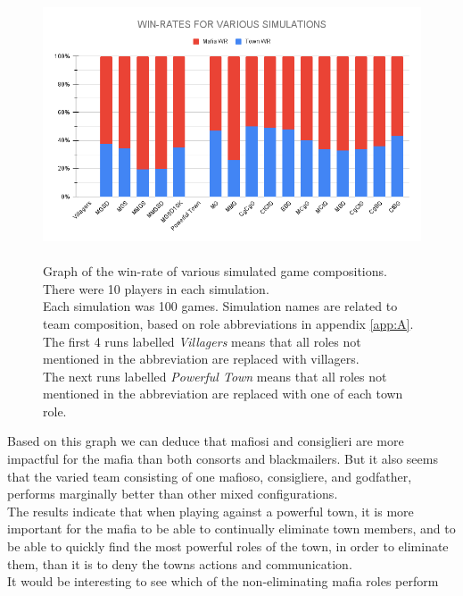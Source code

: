 \begin{figure}[H]
    \includegraphics[width=1\linewidth]{figures/Winrates}
    \caption{\\Graph of the win-rate of various simulated game compositions.\\
        There were 10 players in each simulation.\\
        Each simulation was 100 games.
        Simulation names are related to team composition, based on role
        abbreviations in appendix \ref{app:A}.\\
        The first 4 runs labelled \textit{Villagers} means that all roles not
        mentioned in the abbreviation are replaced with villagers.\\
        The next runs labelled \textit{Powerful Town} means that all roles not
        mentioned in the abbreviation are replaced with	one of each town role.}
    \label{fig:VariousSimulations}
\end{figure}
\vspace{-5px}Based on this graph we can deduce that mafiosi and
consiglieri are more
impactful for the mafia than both consorts and blackmailers. But it also seems
that the varied team consisting of one mafioso, consigliere, and godfather,
performs marginally better than other mixed configurations. \\
The results indicate  that when playing against a powerful town, it is more
important for the mafia to be able to continually eliminate town members, and to be
able to quickly find the most powerful roles of the town, in order to eliminate
them, than it is to deny the towns actions and communication. \\
It would be interesting to see which of the non-eliminating mafia roles perform
